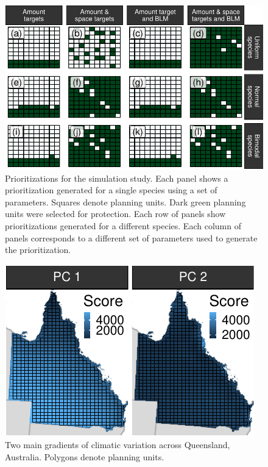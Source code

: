 \begin{figure}
\centering
\includegraphics{figures_files/figure-latex/unnamed-chunk-5-1.pdf}
\caption{Prioritizations for the simulation study. Each panel shows a
prioritization generated for a single species using a set of parameters.
Squares denote planning units. Dark green planning units were selected
for protection. Each row of panels show prioritizations generated for a
different species. Each column of panels corresponds to a different set
of parameters used to generate the prioritization.}
\end{figure}

\begin{figure}
\centering
\includegraphics{figures_files/figure-latex/unnamed-chunk-6-1.pdf}
\caption{Two main gradients of climatic variation across Queensland,
Australia. Polygons denote planning units.}
\end{figure}

